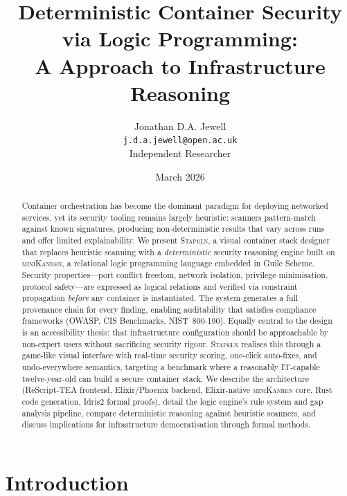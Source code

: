 \documentclass[11pt,twocolumn]{article}
\title{%
  Deterministic Container Security via Logic Programming:\\
  A \minikanren Approach to Infrastructure Reasoning%
}
\author{
  Jonathan D.A. Jewell\\
  \texttt{j.d.a.jewell@open.ac.uk}\\
  Independent Researcher
}
\date{March 2026}
\newcommand{\stapeln}{\textsc{Stapeln}\xspace}
\newcommand{\minikanren}{\textsc{miniKanren}\xspace}
\begin{document}
\maketitle

\begin{abstract}
Container orchestration has become the dominant paradigm for deploying
networked services, yet its security tooling remains largely heuristic:
scanners pattern-match against known signatures, producing non-deterministic
results that vary across runs and offer limited explainability. We present
\stapeln, a visual container stack designer that replaces heuristic scanning
with a \emph{deterministic} security reasoning engine built on \minikanren,
a relational logic programming language embedded in Guile Scheme. Security
properties---port conflict freedom, network isolation, privilege
minimisation, protocol safety---are expressed as logical relations and
verified via constraint propagation \emph{before} any container is
instantiated. The system generates a full provenance chain for every
finding, enabling auditability that satisfies compliance frameworks
(OWASP, CIS Benchmarks, NIST~800-190). Equally central to the design is
an accessibility thesis: that infrastructure configuration should be
approachable by non-expert users without sacrificing security rigour.
\stapeln realises this through a game-like visual interface with real-time
security scoring, one-click auto-fixes, and undo-everywhere semantics,
targeting a benchmark where a reasonably IT-capable twelve-year-old can
build a secure container stack. We describe the architecture
(ReScript-TEA frontend, Elixir/Phoenix backend, Elixir-native \minikanren
core, Rust code generation, Idris2 formal proofs), detail the logic
engine's rule system and gap analysis pipeline, compare deterministic
reasoning against heuristic scanners, and discuss implications for
infrastructure democratisation through formal methods.
\end{abstract}

\section{Introduction}
\label{sec:introduction}
\end{document}
